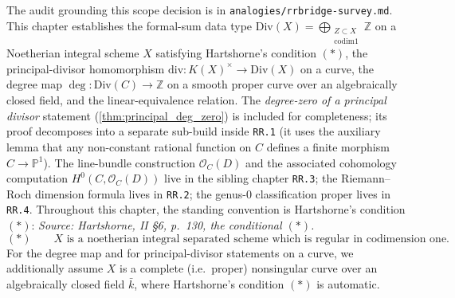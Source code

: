 The audit grounding this scope decision is in
\texttt{analogies/rrbridge-survey.md}.
This chapter establishes the formal-sum data type
\(\mathrm{Div}(X) = \bigoplus_{\substack{Z \subset X \\ \mathrm{codim} 1}} \mathbb Z\) on a
Noetherian integral scheme \(X\) satisfying Hartshorne's condition \((*)\), the
principal-divisor homomorphism \(\mathrm{div} \colon K(X)^{\times} \to \mathrm{Div}(X)\) on a
curve, the degree map \(\deg \colon \mathrm{Div}(C) \to \mathbb Z\) on a smooth proper
curve over an algebraically closed field, and the linear-equivalence
relation. The \emph{degree-zero of a principal divisor} statement
(\ref{thm:principal_deg_zero}) is included for completeness; its proof
decomposes into a separate sub-build inside \texttt{RR.1} (it uses the
auxiliary lemma that any non-constant rational function on \(C\) defines a
finite morphism \(C \to \mathbb P^1\)). The line-bundle construction $\mathcal
O_C(D)$ and the associated cohomology computation $H^0(C, \mathcal O_C(D))$
live in the sibling chapter \texttt{RR.3}; the Riemann--Roch dimension
formula lives in \texttt{RR.2}; the genus-\(0\) classification proper lives in
\texttt{RR.4}.
Throughout this chapter, the standing convention is Hartshorne's condition
\((*)\):
\textit{Source: Hartshorne, II \S6, p.~130, the conditional \((*)\).}
\[
  (\ast)\qquad
  X \text{ is a noetherian integral separated scheme which is regular in
  codimension one.}
\]
For the degree map and for principal-divisor statements on a curve, we
additionally assume \(X\) is a complete (i.e.\ proper) nonsingular curve over
an algebraically closed field \(\bar k\), where Hartshorne's condition \((*)\) is
automatic.
